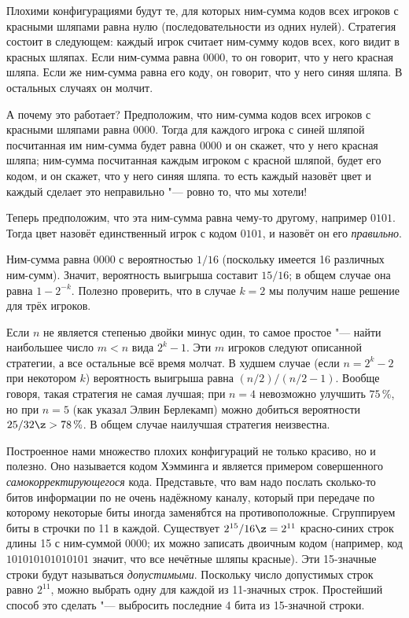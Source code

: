 \documentclass[twoside]{book}
\begin{document}
Плохими конфигурациями будут те, для которых ним-сумма кодов всех
игроков с красными шляпами равна нулю (последовательности из одних нулей).
Стратегия состоит в следующем:
каждый игрок считает ним-сумму кодов всех, кого видит в красных шляпах.
Если ним-сумма равна $0000$, то он говорит, что у него красная шляпа.
Если же ним-сумма равна его коду, он говорит, что у него синяя шляпа.
В остальных случаях он молчит.

А почему это работает?
Предположим, что ним-сумма кодов всех игроков с красными шляпами равна $0000$.
Тогда для каждого игрока с синей шляпой посчитанная им ним-сумма будет равна $0000$ и он скажет, что у него красная шляпа;
ним-сумма посчитанная каждым игроком с красной шляпой, будет его кодом, и он скажет, что у него синяя шляпа.
то есть каждый назовёт цвет и каждый сделает это неправильно "--- ровно то, что мы хотели!

Теперь  предположим, что эта ним-сумма равна чему-то другому, например $0101$.
Тогда цвет назовёт единственный игрок с кодом  $0101$, и назовёт он его \emph{правильно}.

Ним-сумма равна $0000$ с вероятностью $1/16$ (поскольку имеется 16 различных ним-сумм).
Значит, вероятность выигрыша составит $15/16$;
в общем случае она равна $1-2^{-k}$.
Полезно проверить, что в случае $k=2$ мы получим наше решение для трёх игроков.



Если $n$ не является степенью двойки минус один, то самое простое
"--- найти наибольшее число $m<n$ вида $2^k-1$.
Эти $m$ игроков следуют описанной стратегии, а все остальные всё время молчат.
В худшем случае (если $n=2^k-2$ при некотором $k$) вероятность выигрыша равна $(n/2)/(n/2-1)$.
Вообще говоря, такая стратегия не самая лучшая;
при $n=4$ невозможно улучшить $75\,\%$, но при $n=5$ (как указал Элвин Берлекамп) можно добиться вероятности $25/32\z>78\,\%$.
В общем случае наилучшая стратегия неизвестна.
\heart

\medskip

Построенное нами множество плохих конфигураций не только красиво, но и
полезно.
Оно называется кодом Хэмминга и является примером
совершенного \emph{самокорректирующегося} кода.
Представьте, что вам
надо послать сколько-то битов информации по не очень надёжному каналу,
который при передаче по которому некоторые биты иногда заменябтся на
противоположные.
Сгруппируем биты в строчки по 11 в каждой.
Существует $2^{15}/16\z=2^{11}$ красно-синих строк длины 15 с
ним-суммой $0000$; их можно записать двоичным кодом (например, код
$101010101010101$ значит, что все нечётные шляпы красные).
Эти
15-значные строки будут называться \emph{допустимыми}.
Поскольку
число допустимых строк равно $2^{11}$, можно выбрать одну для каждой
из 11-значных строк.
Простейший способ это сделать "--- выбросить
последние 4 бита из 15-значной строки.
\end{document}
